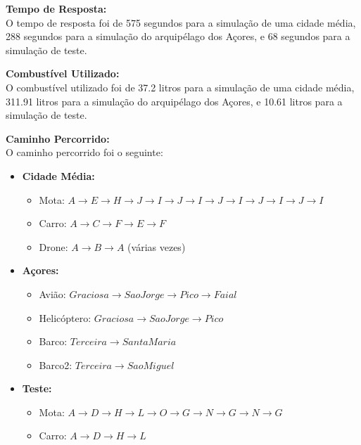 \documentclass[a4paper,12pt]{scrreprt}
\begin{document}
\textbf{Tempo de Resposta:} \\
O tempo de resposta foi de 575 segundos para a simulação de uma cidade média, 288 segundos para a simulação
do arquipélago dos Açores, e 68 segundos para a simulação de teste.

\textbf{Combustível Utilizado:} \\
O combustível utilizado foi de 37.2 litros para a simulação de uma cidade média, 311.91 litros para a simulação
do arquipélago dos Açores, e 10.61 litros para a simulação de teste.

\clearpage

\textbf{Caminho Percorrido:} \\
O caminho percorrido foi o seguinte:
\begin{itemize}
    \item \textbf{Cidade Média:}
        \begin{itemize}
            \item Mota: $A \rightarrow E \rightarrow H \rightarrow J \rightarrow I \rightarrow J
             \rightarrow I \rightarrow J \rightarrow I \rightarrow J \rightarrow I \rightarrow J \rightarrow I$ \\
            \item Carro: $A \rightarrow C \rightarrow F \rightarrow E \rightarrow F$ \\
            \item Drone: $A \rightarrow B \rightarrow A$ (várias vezes)
        \end{itemize}
    \item \textbf{Açores:}
        \begin{itemize}
            \item Avião: $Graciosa \rightarrow Sao Jorge \rightarrow Pico \rightarrow Faial$ \\
            \item Helicóptero: $Graciosa \rightarrow Sao Jorge \rightarrow Pico$ \\
            \item Barco: $Terceira \rightarrow Santa Maria$ \\
            \item Barco2: $Terceira \rightarrow Sao Miguel$
        \end{itemize}
    \item \textbf{Teste:}
        \begin{itemize}
            \item Mota: $A \rightarrow D \rightarrow H \rightarrow L \rightarrow O
            \rightarrow G \rightarrow N \rightarrow G \rightarrow N \rightarrow G$ \\
            \item Carro: $A \rightarrow D \rightarrow H \rightarrow L$
        \end{itemize}
\end{itemize}
\end{document}
